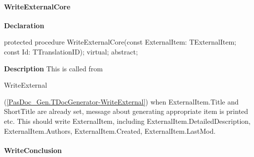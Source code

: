 \documentclass{report}
\newif\ifpdf
\begin{document}
\paragraph*{WriteExternalCore}\hspace*{\fill}

\label{PasDoc_Gen.TDocGenerator-WriteExternalCore}
\begin{list}{}{
\setlength{\itemindent}{0cm}
\setlength{\listparindent}{0cm}
\setlength{\leftmargin}{\evensidemargin}
\addtolength{\leftmargin}{\tmplength}
\settowidth{\labelsep}{X}
\addtolength{\leftmargin}{\labelsep}
\setlength{\labelwidth}{\tmplength}
}
\item[\textbf{Declaration}\hfill]
\ifpdf
\begin{flushleft}
\fi
\begin{ttfamily}
protected procedure WriteExternalCore(const ExternalItem: TExternalItem; const Id: TTranslationID); virtual; abstract;\end{ttfamily}

\ifpdf
\end{flushleft}
\fi

\par
\item[\textbf{Description}]
This is called from \begin{ttfamily}WriteExternal\end{ttfamily}(\ref{PasDoc_Gen.TDocGenerator-WriteExternal}) when ExternalItem.Title and ShortTitle are already set, message about generating appropriate item is printed etc. This should write ExternalItem, including ExternalItem.DetailedDescription, ExternalItem.Authors, ExternalItem.Created, ExternalItem.LastMod.

\end{list}
\paragraph*{WriteConclusion}\hspace*{\fill}
\end{document}

